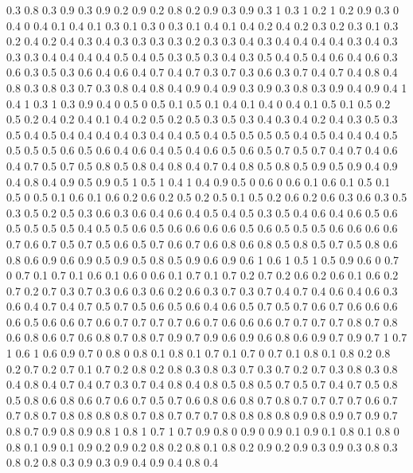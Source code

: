0.3 0.8
0.3 0.9
0.3 0.9
0.2 0.9
0.2 0.8
0.2 0.9
0.3 0.9
0.3 1
0.3 1
0.2 1
0.2 0.9
0.3 0
0.4 0
0.4 0.1
0.4 0.1
0.3 0.1
0.3 0
0.3 0.1
0.4 0.1
0.4 0.2
0.4 0.2
0.3 0.2
0.3 0.1
0.3 0.2
0.4 0.2
0.4 0.3
0.4 0.3
0.3 0.3
0.3 0.2
0.3 0.3
0.4 0.3
0.4 0.4
0.4 0.4
0.3 0.4
0.3 0.3
0.3 0.4
0.4 0.4
0.4 0.5
0.4 0.5
0.3 0.5
0.3 0.4
0.3 0.5
0.4 0.5
0.4 0.6
0.4 0.6
0.3 0.6
0.3 0.5
0.3 0.6
0.4 0.6
0.4 0.7
0.4 0.7
0.3 0.7
0.3 0.6
0.3 0.7
0.4 0.7
0.4 0.8
0.4 0.8
0.3 0.8
0.3 0.7
0.3 0.8
0.4 0.8
0.4 0.9
0.4 0.9
0.3 0.9
0.3 0.8
0.3 0.9
0.4 0.9
0.4 1
0.4 1
0.3 1
0.3 0.9
0.4 0
0.5 0
0.5 0.1
0.5 0.1
0.4 0.1
0.4 0
0.4 0.1
0.5 0.1
0.5 0.2
0.5 0.2
0.4 0.2
0.4 0.1
0.4 0.2
0.5 0.2
0.5 0.3
0.5 0.3
0.4 0.3
0.4 0.2
0.4 0.3
0.5 0.3
0.5 0.4
0.5 0.4
0.4 0.4
0.4 0.3
0.4 0.4
0.5 0.4
0.5 0.5
0.5 0.5
0.4 0.5
0.4 0.4
0.4 0.5
0.5 0.5
0.5 0.6
0.5 0.6
0.4 0.6
0.4 0.5
0.4 0.6
0.5 0.6
0.5 0.7
0.5 0.7
0.4 0.7
0.4 0.6
0.4 0.7
0.5 0.7
0.5 0.8
0.5 0.8
0.4 0.8
0.4 0.7
0.4 0.8
0.5 0.8
0.5 0.9
0.5 0.9
0.4 0.9
0.4 0.8
0.4 0.9
0.5 0.9
0.5 1
0.5 1
0.4 1
0.4 0.9
0.5 0
0.6 0
0.6 0.1
0.6 0.1
0.5 0.1
0.5 0
0.5 0.1
0.6 0.1
0.6 0.2
0.6 0.2
0.5 0.2
0.5 0.1
0.5 0.2
0.6 0.2
0.6 0.3
0.6 0.3
0.5 0.3
0.5 0.2
0.5 0.3
0.6 0.3
0.6 0.4
0.6 0.4
0.5 0.4
0.5 0.3
0.5 0.4
0.6 0.4
0.6 0.5
0.6 0.5
0.5 0.5
0.5 0.4
0.5 0.5
0.6 0.5
0.6 0.6
0.6 0.6
0.5 0.6
0.5 0.5
0.5 0.6
0.6 0.6
0.6 0.7
0.6 0.7
0.5 0.7
0.5 0.6
0.5 0.7
0.6 0.7
0.6 0.8
0.6 0.8
0.5 0.8
0.5 0.7
0.5 0.8
0.6 0.8
0.6 0.9
0.6 0.9
0.5 0.9
0.5 0.8
0.5 0.9
0.6 0.9
0.6 1
0.6 1
0.5 1
0.5 0.9
0.6 0
0.7 0
0.7 0.1
0.7 0.1
0.6 0.1
0.6 0
0.6 0.1
0.7 0.1
0.7 0.2
0.7 0.2
0.6 0.2
0.6 0.1
0.6 0.2
0.7 0.2
0.7 0.3
0.7 0.3
0.6 0.3
0.6 0.2
0.6 0.3
0.7 0.3
0.7 0.4
0.7 0.4
0.6 0.4
0.6 0.3
0.6 0.4
0.7 0.4
0.7 0.5
0.7 0.5
0.6 0.5
0.6 0.4
0.6 0.5
0.7 0.5
0.7 0.6
0.7 0.6
0.6 0.6
0.6 0.5
0.6 0.6
0.7 0.6
0.7 0.7
0.7 0.7
0.6 0.7
0.6 0.6
0.6 0.7
0.7 0.7
0.7 0.8
0.7 0.8
0.6 0.8
0.6 0.7
0.6 0.8
0.7 0.8
0.7 0.9
0.7 0.9
0.6 0.9
0.6 0.8
0.6 0.9
0.7 0.9
0.7 1
0.7 1
0.6 1
0.6 0.9
0.7 0
0.8 0
0.8 0.1
0.8 0.1
0.7 0.1
0.7 0
0.7 0.1
0.8 0.1
0.8 0.2
0.8 0.2
0.7 0.2
0.7 0.1
0.7 0.2
0.8 0.2
0.8 0.3
0.8 0.3
0.7 0.3
0.7 0.2
0.7 0.3
0.8 0.3
0.8 0.4
0.8 0.4
0.7 0.4
0.7 0.3
0.7 0.4
0.8 0.4
0.8 0.5
0.8 0.5
0.7 0.5
0.7 0.4
0.7 0.5
0.8 0.5
0.8 0.6
0.8 0.6
0.7 0.6
0.7 0.5
0.7 0.6
0.8 0.6
0.8 0.7
0.8 0.7
0.7 0.7
0.7 0.6
0.7 0.7
0.8 0.7
0.8 0.8
0.8 0.8
0.7 0.8
0.7 0.7
0.7 0.8
0.8 0.8
0.8 0.9
0.8 0.9
0.7 0.9
0.7 0.8
0.7 0.9
0.8 0.9
0.8 1
0.8 1
0.7 1
0.7 0.9
0.8 0
0.9 0
0.9 0.1
0.9 0.1
0.8 0.1
0.8 0
0.8 0.1
0.9 0.1
0.9 0.2
0.9 0.2
0.8 0.2
0.8 0.1
0.8 0.2
0.9 0.2
0.9 0.3
0.9 0.3
0.8 0.3
0.8 0.2
0.8 0.3
0.9 0.3
0.9 0.4
0.9 0.4
0.8 0.4
